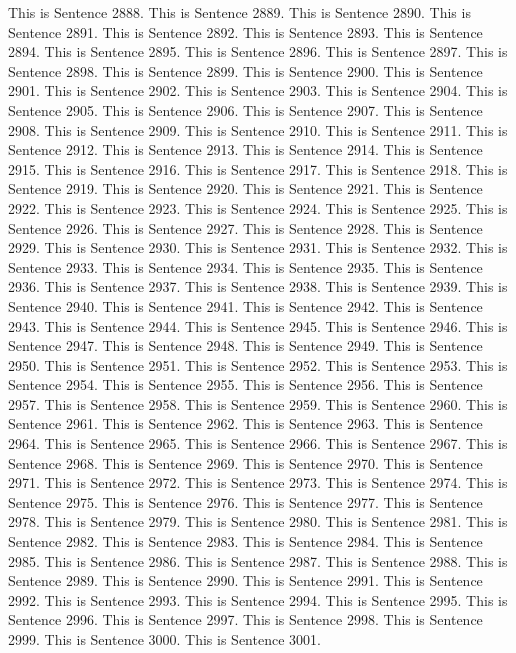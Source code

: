 \documentclass{article}
\begin{document}
This is Sentence 2888.
This is Sentence 2889.
This is Sentence 2890.
This is Sentence 2891.
This is Sentence 2892.
This is Sentence 2893.
This is Sentence 2894.
This is Sentence 2895.
This is Sentence 2896.
This is Sentence 2897.
This is Sentence 2898.
This is Sentence 2899.
This is Sentence 2900.
This is Sentence 2901.
This is Sentence 2902.
This is Sentence 2903.
This is Sentence 2904.
This is Sentence 2905.
This is Sentence 2906.
This is Sentence 2907.
This is Sentence 2908.
This is Sentence 2909.
This is Sentence 2910.
This is Sentence 2911.
This is Sentence 2912.
This is Sentence 2913.
This is Sentence 2914.
This is Sentence 2915.
This is Sentence 2916.
This is Sentence 2917.
This is Sentence 2918.
This is Sentence 2919.
This is Sentence 2920.
This is Sentence 2921.
This is Sentence 2922.
This is Sentence 2923.
This is Sentence 2924.
This is Sentence 2925.
This is Sentence 2926.
This is Sentence 2927.
This is Sentence 2928.
This is Sentence 2929.
This is Sentence 2930.
This is Sentence 2931.
This is Sentence 2932.
This is Sentence 2933.
This is Sentence 2934.
This is Sentence 2935.
This is Sentence 2936.
This is Sentence 2937.
This is Sentence 2938.
This is Sentence 2939.
This is Sentence 2940.
This is Sentence 2941.
This is Sentence 2942.
This is Sentence 2943.
This is Sentence 2944.
This is Sentence 2945.
This is Sentence 2946.
This is Sentence 2947.
This is Sentence 2948.
This is Sentence 2949.
This is Sentence 2950.
This is Sentence 2951.
This is Sentence 2952.
This is Sentence 2953.
This is Sentence 2954.
This is Sentence 2955.
This is Sentence 2956.
This is Sentence 2957.
This is Sentence 2958.
This is Sentence 2959.
This is Sentence 2960.
This is Sentence 2961.
This is Sentence 2962.
This is Sentence 2963.
This is Sentence 2964.
This is Sentence 2965.
This is Sentence 2966.
This is Sentence 2967.
This is Sentence 2968.
This is Sentence 2969.
This is Sentence 2970.
This is Sentence 2971.
This is Sentence 2972.
This is Sentence 2973.
This is Sentence 2974.
This is Sentence 2975.
This is Sentence 2976.
This is Sentence 2977.
This is Sentence 2978.
This is Sentence 2979.
This is Sentence 2980.
This is Sentence 2981.
This is Sentence 2982.
This is Sentence 2983.
This is Sentence 2984.
This is Sentence 2985.
This is Sentence 2986.
This is Sentence 2987.
This is Sentence 2988.
This is Sentence 2989.
This is Sentence 2990.
This is Sentence 2991.
This is Sentence 2992.
This is Sentence 2993.
This is Sentence 2994.
This is Sentence 2995.
This is Sentence 2996.
This is Sentence 2997.
This is Sentence 2998.
This is Sentence 2999.
This is Sentence 3000.
This is Sentence 3001.
\end{document}
